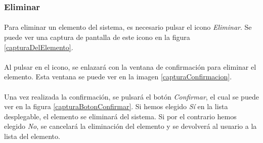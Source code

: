 \subsubsection{Eliminar}

  \paragraph{}Para eliminar un elemento del sistema,  es necesario pulsar el
  icono \textit{Eliminar}. Se puede ver una captura de pantalla de este
  icono en la figura \ref{capturaDelElemento}.

  \paragraph{}Al pulsar en el icono, se enlazará con la ventana de confirmación
  para eliminar el elemento. Esta ventana se puede ver en la imagen
  \ref{capturaConfirmacion}.

  \paragraph{}Una vez realizada la confirmación, se pulsará el botón
  \textit{Confirmar}, el cual se puede ver en la figura
  \ref{capturaBotonConfirmar}. Si hemos elegido \textit{Sí} en la lista
  desplegable, el elemento se eliminará del sistema. Si por el contrario hemos
  elegido \textit{No}, se cancelará la eliminación del elemento y se devolverá
  al usuario a la lista del elemento.
